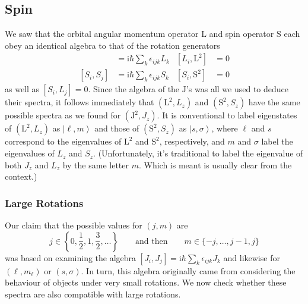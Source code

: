 \documentclass{article}
\theoremstyle{plain}\theoremheaderfont{\normalfont\itshape}\theorembodyfont{\rmfamily}\theoremseparator{.}\newtheorem*{rem}{Remark}\newtheorem*{ex}{Example}\newtheorem*{proof}{Proof}\newtheorem*{altp}{Alternative proof}
\theoremstyle{plain}\theoremheaderfont{\normalfont\bfseries}\theorembodyfont{\rmfamily}\theoremseparator{.}\newtheorem{thm}{Theorem}[section]\newtheorem{lem}[thm]{Lemma}\newtheorem{prop}[thm]{Proposition}\newtheorem*{cor}{Corollary}\newtheorem{defn}[thm]{Definition}\newtheorem{clm}[thm]{Claim}\newtheorem{clminproof}{Claim}
\theoremstyle{break}\theoremheaderfont{\normalfont\itshape}\theorembodyfont{\rmfamily}\theoremseparator{.\medskip}\newtheorem*{proofskip}{Proof}\newtheorem*{exs}{Examples}\newtheorem*{rems}{Remarks}
\theoremstyle{break}\theoremheaderfont{\normalfont\bfseries}\theorembodyfont{\rmfamily}\theoremseparator{.\medskip}\newtheorem{lemskip}[thm]{Lemma}\newtheorem{defnskip}[thm]{Definition}\newtheorem{propskip}[thm]{Proposition}\newtheorem{thmskip}[thm]{Theorem}
\numberwithin{equation}{section}
\newcommand{\ii}{\mathrm{i}}
\newcommand{\ket}[1]{\left| #1 \right\rangle}
\newcommand{\vb}[1]{\bm{\mathrm{#1}}}
\begin{document}
    \subsection{Spin}\label{Chap:Spin}
    We saw that the orbital angular momentum operator \(\vb{L}\) and spin operator \(\vb{S}\) each obey an identical algebra to that of the rotation generators
    \begin{align}
        [L_i,L_j]&=\ii\hbar\sum_k\epsilon_{ijk}L_k &[L_i,\vb{L}^2]&=0\\
        [S_i,S_j]&=\ii\hbar\sum_k\epsilon_{ijk}S_k &[S_i,\vb{S}^2]&=0
    \end{align}
    as well as \([S_i,L_j]=0\). Since the algebra of the \(\vb{J}\)'s was all we used to deduce their spectra, it follows immediately that \((\vb{L}^2,L_z)\) and \((\vb{S}^2,S_z)\) have the same possible spectra as we found for \((\vb{J}^2,J_z)\). It is conventional to label eigenstates of \((\vb{L}^2,L_z)\) as \(\ket{\ell,m}\) and those of \((\vb{S}^2,S_z)\) as \(\ket{s,\sigma}\), where \(\ell\) and \(s\) correspond to the eigenvalues of \(\vb{L}^2\) and \(\vb{S}^2\), respectively, and \(m\) and \(\sigma\) label the eigenvalues of \(L_z\) and \(S_z\). (Unfortunately, it's traditional to label the eigenvalue of both \(J_z\) and \(L_z\) by the same letter \(m\). Which is meant is usually clear from the context.)

    \subsubsection{Large Rotations}\label{Chap:Large_Rot}
    Our claim that the possible values for \((j,m)\) are
    \begin{equation}
        j\in\left\{0,\frac{1}{2},1,\frac{3}{2},\dots\right\}\qquad\text{and then}\qquad m\in\{-j,\dots,j-1,j\}
    \end{equation}
    was based on examining the algebra \([J_i,J_j]=\ii\hbar\sum_k\epsilon_{ijk}J_k\) and likewise for \((\ell,m_\ell)\) or \((s,\sigma)\). In turn, this algebra originally came from considering the behaviour of objects under very small rotations. We now check whether these spectra are also compatible with large rotations.
\end{document}
